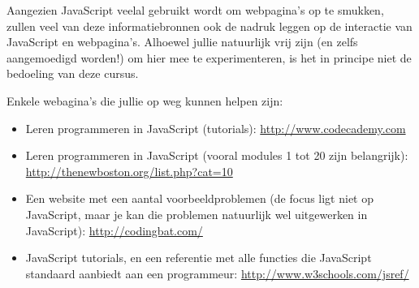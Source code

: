 Aangezien JavaScript veelal gebruikt wordt om webpagina's op te smukken, zullen veel van deze informatiebronnen ook de nadruk leggen op de interactie van JavaScript en webpagina's. Alhoewel jullie natuurlijk vrij zijn (en zelfs aangemoedigd worden!) om hier mee te experimenteren, is het in principe niet de bedoeling van deze cursus.

Enkele webagina's die jullie op weg kunnen helpen zijn:
\begin{itemize}
\item Leren programmeren in JavaScript (tutorials): \url{http://www.codecademy.com}
\item Leren programmeren in JavaScript (vooral modules 1 tot 20 zijn belangrijk): \url{http://thenewboston.org/list.php?cat=10}
\item Een website met een aantal voorbeeldproblemen (de focus ligt niet op JavaScript, maar je kan die problemen natuurlijk wel uitgewerken in JavaScript): \url{http://codingbat.com/}
\item JavaScript tutorials, en een referentie met alle functies die JavaScript standaard aanbiedt aan een programmeur: \url{http://www.w3schools.com/jsref/}
\end{itemize}

